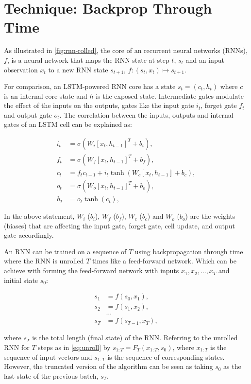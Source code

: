 \section{Technique: Backprop Through Time}
\label{sec:bptt}

As illustrated in \ref{fig:rnn-rolled}, the core of an recurrent neural networks (RNNs), $f$, is a neural network that maps the RNN state at step $t$, $s_t$ and an input observation $x_t$ to a new RNN state $s_{t+1}$, $f: (s_t, x_t) \mapsto s_{t+1}$.

For comparison, an LSTM-powered RNN core \cite{Hochreiter1997} has a state $s_t = (c_t, h_t)$ where $c$ is an internal core state and $h$ is the exposed state. Intermediate gates modulate the effect of the inputs on the outputs, gates like the input gate $i_t$, forget gate $f_t$ and output gate $o_t$. The correlation between the inputs, outputs and internal gates of an LSTM cell can be explained as:

\begin{align*}
i_t &= \sigma(W_i [x_t, h_{t-1}]^T + b_i), \\
f_t &= \sigma(W_f [x_t, h_{t-1}]^T + b_f), \\
c_t &= f_t c_{t-1} + i_t \tanh(W_c [x_t, h_{t-1}] + b_c), \\
o_t &= \sigma(W_o [x_t, h_{t-1}]^T + b_o), \\
h_t &= o_t \tanh(c_t),
\end{align*}

In the above statement, $W_i$ ($b_i$), $W_f$ ($b_f$), $W_c$ ($b_c$) and $W_o$ ($b_o$) are the weights (biases) that are affecting the input gate, forget gate, cell update, and output gate accordingly.

An RNN can be trained on a sequence of $T$ using backpropagation through time where the RNN is unrolled $T$ times like a feed-forward network.
Which can be achieve with forming the feed-forward network with inputs
$x_1, x_2, \dots, x_T$ and initial state $s_0$:

\begin{align}
s_1 &= f(s_0, x_1), \nonumber \\
s_2 &= f(s_1, x_2), \nonumber \\
&\dots \nonumber \\
\label{eq:unroll}
s_T &= f(s_{T-1}, x_T), 
\end{align}

where $s_T$ is the total length (final state) of the RNN.
Referring to the unrolled RNN for $T$ steps as in \eqref{eq:unroll} by $s_{1:T} = F_T(x_{1:T}, s_0)$,
where $x_{1:T}$ is the sequence of input vectors and $s_{1:T}$ is the sequence of corresponding states. However, the truncated version of the algorithm can be seen as taking $s_0$ as the last state of the previous batch, $s_T$.


